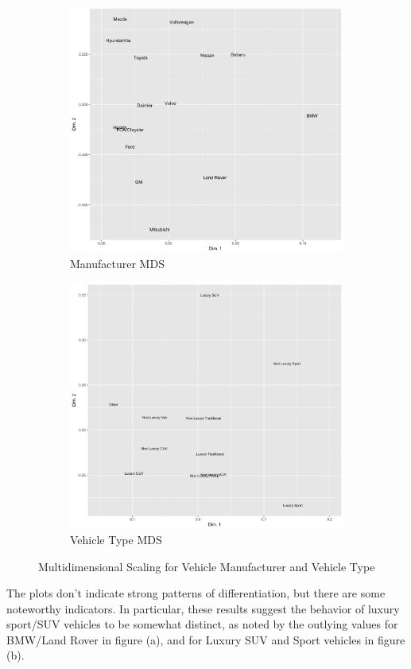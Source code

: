 \documentclass[11pt, oneside,titlepage]{article}   	%
\begin{document}
\begin{figure}[H]
\centering
\begin{subfigure}{.5\textwidth}
	\centering
	\includegraphics[width=.8\linewidth]{ManufacturerMDSPlot.png}
	\caption{Manufacturer MDS}
	\label{fig:sub1}
\end{subfigure}%
\begin{subfigure}{.5\textwidth}
  \centering
  \includegraphics[width=.8\linewidth]{VehicleTypeMDSPlot.png}
  \caption{Vehicle Type MDS}
  \label{fig:sub2}
\end{subfigure}
\caption{Multidimensional Scaling for Vehicle Manufacturer and Vehicle Type}
\label{fig:test}
\end{figure}

The plots don't indicate strong patterns of differentiation, but there are some noteworthy indicators. In particular, these results suggest the behavior of luxury sport/SUV vehicles to be somewhat distinct, as noted by the outlying values for BMW/Land Rover in figure (a), and for Luxury SUV and Sport vehicles in figure (b).
\end{document}
